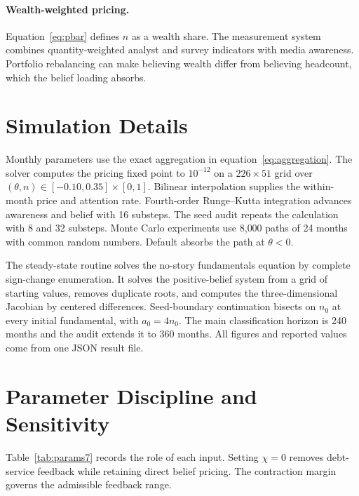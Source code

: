 \documentclass[11pt]{article}
\theoremstyle{definition}
\begin{document}
\paragraph{Wealth-weighted pricing.} Equation~\eqref{eq:pbar} defines $n$ as a wealth share. The measurement system combines quantity-weighted analyst and survey indicators with media awareness. Portfolio rebalancing can make believing wealth differ from believing headcount, which the belief loading absorbs.

\section{Simulation Details}\label{app:sim}

Monthly parameters use the exact aggregation in equation~\eqref{eq:aggregation}. The solver computes the pricing fixed point to $10^{-12}$ on a $226\times51$ grid over $(\theta,n)\in[-0.10,0.35]\times[0,1]$. Bilinear interpolation supplies the within-month price and attention rate. Fourth-order Runge--Kutta integration advances awareness and belief with 16 substeps. The seed audit repeats the calculation with 8 and 32 substeps. Monte Carlo experiments use 8{,}000 paths of 24 months with common random numbers. Default absorbs the path at $\theta<0$.

The steady-state routine solves the no-story fundamentals equation by complete sign-change enumeration. It solves the positive-belief system from a grid of starting values, removes duplicate roots, and computes the three-dimensional Jacobian by centered differences. Seed-boundary continuation bisects on $n_0$ at every initial fundamental, with $a_0=4n_0$. The main classification horizon is 240 months and the audit extends it to 360 months. All figures and reported values come from one JSON result file.

\section{Parameter Discipline and Sensitivity}\label{app:params}

Table~\ref{tab:params7} records the role of each input. Setting $\chi=0$ removes debt-service feedback while retaining direct belief pricing. The contraction margin governs the admissible feedback range.
\end{document}
